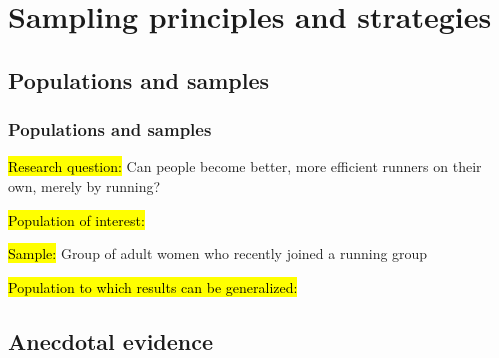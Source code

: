 
\section{Sampling principles and strategies}


\subsection{Populations and samples}


\begin{frame}
\frametitle{Populations and samples}

{
\hl{Research question:} Can people become better, more efficient runners on their own, merely by running? \\

\pause 

\hl{Population of interest:} 
}
\pause 
$\:$ \\
\hl{Sample:} Group of adult women who recently joined a running group

\pause

\hl{Population to which results can be generalized:} 

\end{frame}


\subsection{Anecdotal evidence}


